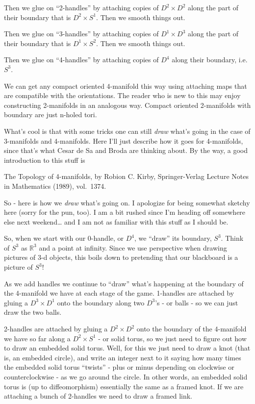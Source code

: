 \documentclass{article}
\begin{document}
Then we glue on ``2-handles'' by attaching copies of \(D^2 \times D^2\)
along the part of their boundary that is \(D^2 \times S^1\). Then we
smooth things out.

Then we glue on ``3-handles'' by attaching copies of \(D^1 \times D^3\)
along the part of their boundary that is \(D^1 \times S^2\). Then we
smooth things out.

Then we glue on ``4-handles'' by attaching copies of \(D^4\) along their
boundary, i.e.~\(S^3\).

We can get any compact oriented 4-manifold this way using attaching maps
that are compatible with the orientations. The reader who is new to this
may enjoy constructing 2-manifolds in an analogous way. Compact oriented
2-manifolds with boundary are just n-holed tori.

What's cool is that with some tricks one can still \emph{draw} what's
going in the case of 3-manifolds and 4-manifolds. Here I'll just
describe how it goes for 4-manifolds, since that's what Cesar de Sa and
Broda are thinking about. By the way, a good introduction to this stuff
is

The Topology of 4-manifolds, by Robion C. Kirby, Springer-Verlag Lecture
Notes in Mathematics (1989), vol.~1374.

So - here is how we \emph{draw} what's going on. I apologize for being
somewhat sketchy here (sorry for the pun, too). I am a bit rushed since
I'm heading off somewhere else next weekend\ldots{} and I am not as
familiar with this stuff as I should be.

So, when we start with our 0-handle, or \(D^4\), we ``draw'' its
boundary, \(S^3\). Think of \(S^3\) as \(\mathbb{R}^3\) and a point at
infinity. Since we use perspective when drawing pictures of 3-d objects,
this boils down to pretending that our blackboard is a picture of
\(S^3\)!

As we add handles we continue to ``draw'' what's happening at the
boundary of the 4-manifold we have at each stage of the game. 1-handles
are attached by gluing a \(D^3 \times D^1\) onto the boundary along two
\(D^3\)'s - or balls - so we can just draw the two balls.

2-handles are attached by gluing a \(D^2 \times D^2\) onto the boundary
of the 4-manifold we have so far along a \(D^2 \times S^1\) - or solid
torus, so we just need to figure out how to draw an embedded solid
torus. Well, for this we just need to draw a knot (that is, an embedded
circle), and write an integer next to it saying how many times the
embedded solid torus ``twists'' - plus or minus depending on clockwise
or counterclockwise - as we go around the circle. In other words, an
embedded solid torus is (up to diffeomorphism) essentially the same as a
framed knot. If we are attaching a bunch of 2-handles we need to draw a
framed link.
\end{document}

